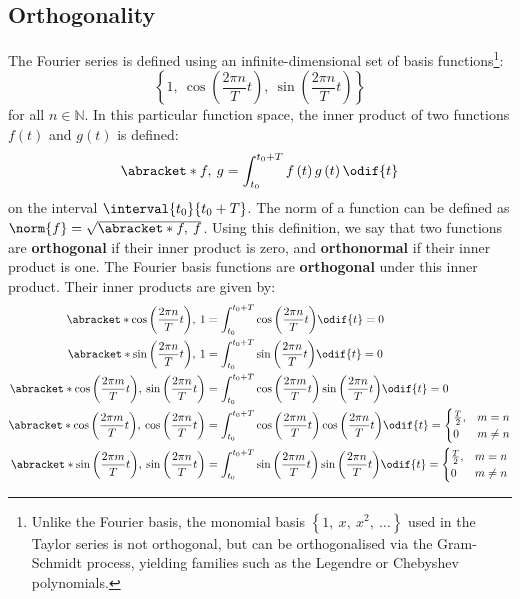 \documentclass{article}
\begin{document}
\subsection{Orthogonality}
The Fourier series is defined using an infinite-dimensional set of
basis functions\footnote{Unlike the Fourier basis, the monomial basis
$\left\{1,\: x,\: x^2,\: \ldots\right\}$ used in the Taylor series is
not orthogonal, but can be orthogonalised via the Gram-Schmidt process,
yielding families such as the Legendre or Chebyshev polynomials.}:
\begin{equation*}
    \left\{ 1, \: \cos{\left( \frac{2\pi n}{T} t \right)}, \: \sin{\left( \frac{2\pi n}{T} t \right)} \right\}
\end{equation*}
for all \(n \in \mathbb{N}\). In this particular function space, the
inner product of two functions \(f\left( t \right)\) and
\(g\left( t \right)\) is defined:
\begin{equation*}
    \abracket*{f,\: g} = \int_{t_0}^{t_0 + T} f\left( t \right) g\left( t \right) \odif{t}
\end{equation*}
on the interval \(\interval{t_0}{t_0 + T}\). The norm of a function can
be defined as \(\norm{f} = \sqrt{\abracket*{f,\: f}}\). Using this
definition, we say that two functions are \textbf{orthogonal} if their
inner product is zero, and \textbf{orthonormal} if their inner product
is one. The Fourier basis functions are \textbf{orthogonal} under this
inner product. Their inner products are given by:
\begin{align*}
    \abracket*{\cos{\left( \frac{2\pi n}{T} t \right)},\: 1}                                       & = \int_{t_0}^{t_0 + T} \cos{\left( \frac{2\pi n}{T} t \right)} \odif{t} = 0                                         \\
    \abracket*{\sin{\left( \frac{2\pi n}{T} t \right)},\: 1}                                       & = \int_{t_0}^{t_0 + T} \sin{\left( \frac{2\pi n}{T} t \right)} \odif{t} = 0                                         \\
    \abracket*{\cos{\left( \frac{2\pi m}{T} t \right)},\: \sin{\left( \frac{2\pi n}{T} t \right)}} & = \int_{t_0}^{t_0 + T} \cos{\left( \frac{2\pi m}{T} t \right)} \sin{\left( \frac{2\pi n}{T} t \right)} \odif{t} = 0 \\
    \abracket*{\cos{\left( \frac{2\pi m}{T} t \right)},\: \cos{\left( \frac{2\pi n}{T} t \right)}} & =
    \int_{t_0}^{t_0 + T} \cos{\left( \frac{2\pi m}{T} t \right)} \cos{\left( \frac{2\pi n}{T} t \right)} \odif{t} =
    \begin{cases}
        \frac{T}{2}, & m = n    \\
        0            & m \neq n
    \end{cases}
    \\
    \abracket*{\sin{\left( \frac{2\pi m}{T} t \right)},\: \sin{\left( \frac{2\pi n}{T} t \right)}} & =
    \int_{t_0}^{t_0 + T} \sin{\left( \frac{2\pi m}{T} t \right)} \sin{\left( \frac{2\pi n}{T} t \right)} \odif{t} =
    \begin{cases}
        \frac{T}{2}, & m = n    \\
        0            & m \neq n
    \end{cases}
\end{align*}
\end{document}
